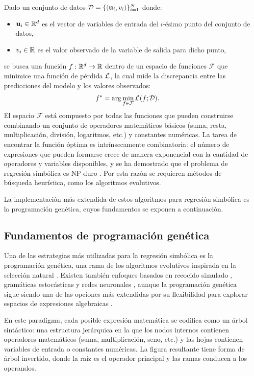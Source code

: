 Dado un conjunto de datos \(\mathcal{D} = \{(\mathbf{u}_i, v_i)\}_{i=1}^{N}\) donde: \begin{itemize} \item \(\mathbf{u}_i \in \mathbb{R}^d\) es el vector de variables de entrada del \(i\)-ésimo punto del conjunto de datos, \item \(v_i \in \mathbb{R}\) es el valor observado de la variable de salida para dicho punto, \end{itemize} se busca una función \(f: \mathbb{R}^d \to \mathbb{R}\) dentro de un espacio de funciones \(\mathcal{F}\) que minimice una función de pérdida \(\mathcal{L}\), la cual mide la discrepancia entre las predicciones del modelo y los valores observados: \begin{equation} f^* = \arg\min_{f \in \mathcal{F}} \mathcal{L}(f; \mathcal{D}). \end{equation} El espacio \(\mathcal{F}\) está compuesto por todas las funciones que pueden construirse combinando un conjunto de operadores matemáticos básicos (suma, resta, multiplicación, división, logaritmos, etc.) y constantes numéricas. La tarea de encontrar la función óptima es intrínsecamente combinatoria: el número de expresiones que pueden formarse crece de manera exponencial con la cantidad de operadores y variables disponibles, y se ha demostrado que el problema de regresión simbólica es NP-duro \cite{virgolin2022np}. Por esta razón se requieren métodos de búsqueda heurística, como los algoritmos evolutivos.

La implementación más extendida de estos algoritmos para regresión simbólica es la programación genética, cuyos fundamentos se exponen a continuación.

\subsection{Fundamentos de programación genética}

Una de las estrategias más utilizadas para la regresión simbólica es la programación genética, una rama de los algoritmos evolutivos inspirada en la selección natural \cite{koza1992genetic}. Existen también enfoques basados en recocido simulado \cite{kantor2021simulated}, gramáticas estocásticas \cite{sotto2017probabilistic} y redes neuronales \cite{costa2021occamnet, deng2024operator}, aunque la programación genética sigue siendo una de las opciones más extendidas por su flexibilidad para explorar espacios de expresiones algebraicas \cite{koza1992genetic, cranmer2023pysr}.

En este paradigma, cada posible expresión matemática se codifica como un árbol sintáctico: una estructura jerárquica en la que los nodos internos contienen operadores matemáticos (suma, multiplicación, seno, etc.) y las hojas contienen variables de entrada o constantes numéricas. La figura resultante tiene forma de árbol invertido, donde la raíz es el operador principal y las ramas conducen a los operandos.

